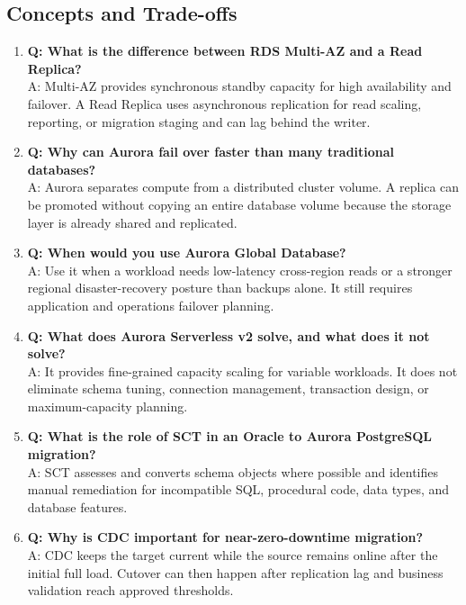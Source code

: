 \subsection{Concepts and Trade-offs}
\begin{enumerate}
    \item \textbf{Q: What is the difference between RDS Multi-AZ and a Read Replica?}\\
    A: Multi-AZ provides synchronous standby capacity for high availability and failover. A Read Replica uses asynchronous replication for read scaling, reporting, or migration staging and can lag behind the writer.
    \item \textbf{Q: Why can Aurora fail over faster than many traditional databases?}\\
    A: Aurora separates compute from a distributed cluster volume. A replica can be promoted without copying an entire database volume because the storage layer is already shared and replicated.
    \item \textbf{Q: When would you use Aurora Global Database?}\\
    A: Use it when a workload needs low-latency cross-region reads or a stronger regional disaster-recovery posture than backups alone. It still requires application and operations failover planning.
    \item \textbf{Q: What does Aurora Serverless v2 solve, and what does it not solve?}\\
    A: It provides fine-grained capacity scaling for variable workloads. It does not eliminate schema tuning, connection management, transaction design, or maximum-capacity planning.
    \item \textbf{Q: What is the role of SCT in an Oracle to Aurora PostgreSQL migration?}\\
    A: SCT assesses and converts schema objects where possible and identifies manual remediation for incompatible SQL, procedural code, data types, and database features.
    \item \textbf{Q: Why is CDC important for near-zero-downtime migration?}\\
    A: CDC keeps the target current while the source remains online after the initial full load. Cutover can then happen after replication lag and business validation reach approved thresholds.
\end{enumerate}

